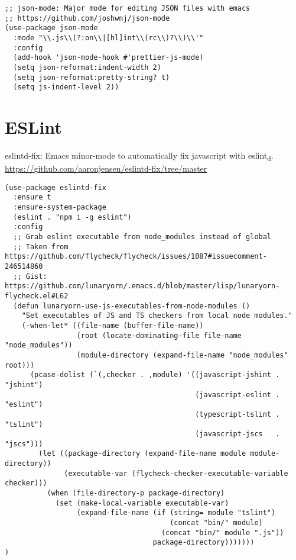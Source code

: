 \documentclass[11pt]{article}
\begin{document}
\begin{verbatim}
;; json-mode: Major mode for editing JSON files with emacs
;; https://github.com/joshwnj/json-mode
(use-package json-mode
  :mode "\\.js\\(?:on\\|[hl]int\\(rc\\)?\\)\\'"
  :config
  (add-hook 'json-mode-hook #'prettier-js-mode)
  (setq json-reformat:indent-width 2)
  (setq json-reformat:pretty-string? t)
  (setq js-indent-level 2))
\end{verbatim}

\section*{ESLint}
\label{sec:org780a90f}

eslintd-fix: Emacs minor-mode to automatically fix javascript with eslint\textsubscript{d}.
\url{https://github.com/aaronjensen/eslintd-fix/tree/master}

\begin{verbatim}
(use-package eslintd-fix
  :ensure t
  :ensure-system-package
  (eslint . "npm i -g eslint")
  :config
  ;; Grab eslint executable from node_modules instead of global
  ;; Taken from https://github.com/flycheck/flycheck/issues/1087#issuecomment-246514860
  ;; Gist: https://github.com/lunaryorn/.emacs.d/blob/master/lisp/lunaryorn-flycheck.el#L62
  (defun lunaryorn-use-js-executables-from-node-modules ()
    "Set executables of JS and TS checkers from local node modules."
    (-when-let* ((file-name (buffer-file-name))
                 (root (locate-dominating-file file-name "node_modules"))
                 (module-directory (expand-file-name "node_modules" root)))
      (pcase-dolist (`(,checker . ,module) '((javascript-jshint . "jshint")
                                             (javascript-eslint . "eslint")
                                             (typescript-tslint . "tslint")
                                             (javascript-jscs   . "jscs")))
        (let ((package-directory (expand-file-name module module-directory))
              (executable-var (flycheck-checker-executable-variable checker)))
          (when (file-directory-p package-directory)
            (set (make-local-variable executable-var)
                 (expand-file-name (if (string= module "tslint")
                                       (concat "bin/" module)
                                     (concat "bin/" module ".js"))
                                   package-directory)))))))
)
\end{verbatim}
\end{document}
